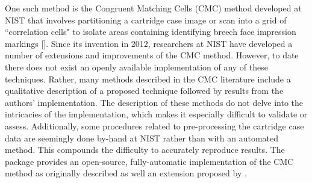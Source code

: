 One such method is the Congruent Matching Cells (CMC) method developed at NIST that involves partitioning a cartridge case image or scan into a grid of ``correlation cells" to isolate areas containing identifying breech face impression markings [\citet{song_proposed_2013}]. Since its invention in 2012, researchers at NIST have developed a number of extensions and improvements of the CMC method. However, to date there does not exist an openly available implementation of any of these techniques. Rather, many methods described in the CMC literature include a qualitative description of a proposed technique followed by results from the authors' implementation. The description of these methods do not delve into the intricacies of the implementation, which makes it especially difficult to validate or assess. Additionally, some procedures related to pre-processing the cartridge case data are seemingly done by-hand at NIST rather than with an automated method. This compounds the difficulty to accurately reproduce results. The  package provides an open-source, fully-automatic implementation of the CMC method as originally described as well an extension proposed by \citet{tong_improved_2015}.




